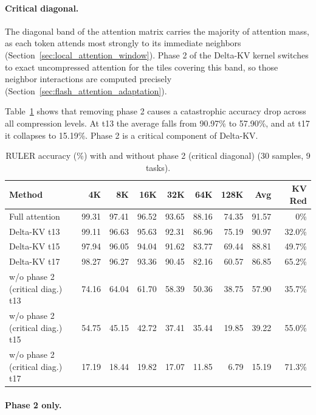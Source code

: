 \paragraph{Critical diagonal.}

The diagonal band of the attention matrix carries the majority of attention mass, as each token attends most strongly to its immediate neighbors (Section~\ref{sec:local_attention_window}). Phase 2 of the Delta-KV kernel switches to exact uncompressed attention for the tiles covering this band, so those neighbor interactions are computed precisely (Section~\ref{sec:flash_attention_adaptation}).

Table~\ref{tab:ablation_diag} shows that removing phase 2 causes a catastrophic accuracy drop across all compression levels. At t13 the average falls from 90.97\% to 57.90\%, and at t17 it collapses to 15.19\%. Phase 2 is a critical component of Delta-KV.

\begin{table}[!ht]
\centering
\caption{RULER accuracy (\%) with and without phase 2 (critical diagonal) (30 samples, 9 tasks).}
\label{tab:ablation_diag}
\begin{tabular}{lrrrrrrrr}
\toprule
Method & 4K & 8K & 16K & 32K & 64K & 128K & Avg & KV Red \\
\midrule
Full attention                    & 99.31 & 97.41 & 96.52 & 93.65 & 88.16 & 74.35 & 91.57 & 0\%    \\
\midrule
Delta-KV t13                & 99.11 & 96.63 & 95.63 & 92.31 & 86.96 & 75.19 & 90.97 & 32.0\% \\
Delta-KV t15                & 97.94 & 96.05 & 94.04 & 91.62 & 83.77 & 69.44 & 88.81 & 49.7\% \\
Delta-KV t17                & 98.27 & 96.27 & 93.36 & 90.45 & 82.16 & 60.57 & 86.85 & 65.2\% \\
\midrule
w/o phase 2 (critical diag.) t13  & 74.16 & 64.04 & 61.70 & 58.39 & 50.36 & 38.75 & 57.90 & 35.7\% \\
w/o phase 2 (critical diag.) t15  & 54.75 & 45.15 & 42.72 & 37.41 & 35.44 & 19.85 & 39.22 & 55.0\% \\
w/o phase 2 (critical diag.) t17  & 17.19 & 18.44 & 19.82 & 17.07 & 11.85 &  6.79 & 15.19 & 71.3\% \\
\bottomrule
\end{tabular}
\end{table}

\paragraph{Phase 2 only.}

